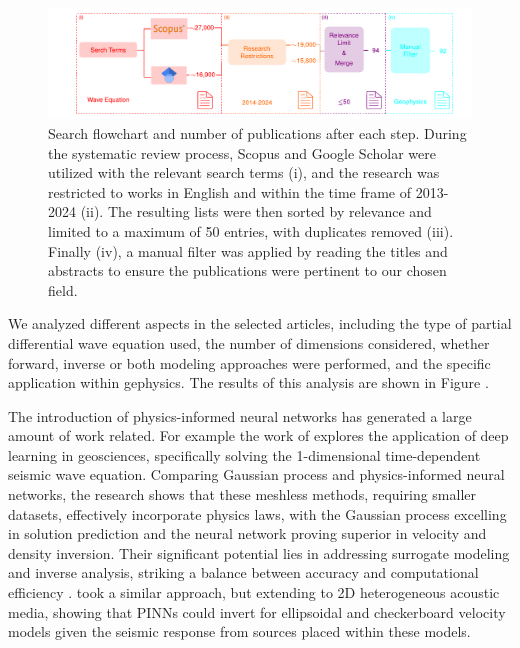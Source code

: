 \documentclass[11pt,twoside]{article}
\begin{document}
\begin{figure}[H]
    \includegraphics[width=1.0\textwidth]{figs/Escheme_Systematic_Review.pdf}
\caption{Search flowchart and number of publications after each step. During the systematic review process, Scopus and Google Scholar were 
utilized with the relevant search terms (i), and the research was restricted to works in English and within the time frame of 2013-2024 (ii). 
The resulting lists were then sorted by relevance and limited to a maximum of 50 entries, with duplicates removed (iii). Finally (iv), a 
manual filter was applied by reading the titles and abstracts to ensure the publications were pertinent to our chosen field.}
    \label{fig:Escheme_Systematic_Review}
\end{figure}

We analyzed different aspects in the selected articles, including the type of partial differential wave equation used, the number of dimensions 
considered, whether forward, inverse or both modeling approaches were performed, and the specific application within gephysics. The results 
of this analysis are shown in Figure  .

The introduction of physics-informed neural networks has generated a large amount of work related. For example the work of 
 explores the application of deep learning in geosciences, specifically solving the 1-dimensional 
time-dependent seismic wave equation. Comparing Gaussian process and physics-informed neural networks, the research shows that these meshless 
methods, requiring smaller datasets, effectively incorporate physics laws, with the Gaussian process excelling in solution prediction and the 
neural network proving superior in velocity and density inversion. Their significant potential lies in addressing surrogate modeling and 
inverse analysis, striking a balance between accuracy and computational efficiency \citep{Song2022}.  took a similar 
approach, but extending to 2D heterogeneous acoustic media, showing that PINNs could invert for ellipsoidal and checkerboard velocity models 
given the seismic response from sources placed within these models.
\end{document}
